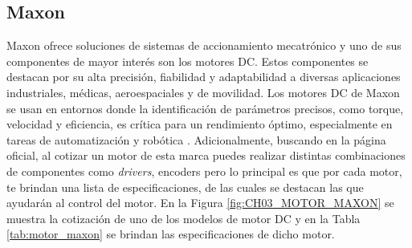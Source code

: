     \subsection{Maxon}
        \noindent
        Maxon ofrece soluciones de sistemas de accionamiento mecatrónico y uno de sus componentes de mayor interés son los motores \ac{DC}. Estos componentes se destacan por su alta precisión, fiabilidad y adaptabilidad a diversas aplicaciones industriales, médicas, aeroespaciales y de movilidad. Los motores \ac{DC} de Maxon se usan en entornos donde la identificación de parámetros precisos, como torque, velocidad y eficiencia, es crítica para un rendimiento óptimo, especialmente en tareas de automatización y robótica \autocite{maxon_group}. Adicionalmente, buscando en la página oficial, al cotizar un motor de esta marca puedes realizar distintas combinaciones de componentes como \textit{drivers}, encoders pero lo principal es que por cada motor, te brindan una lista de especificaciones, de las cuales se destacan las que ayudarán al control del motor. En la Figura \ref{fig:CH03_MOTOR_MAXON} se muestra la cotización de uno de los modelos de motor \ac{DC} y en la Tabla \ref{tab:motor_maxon} se brindan las especificaciones de dicho motor.
    
